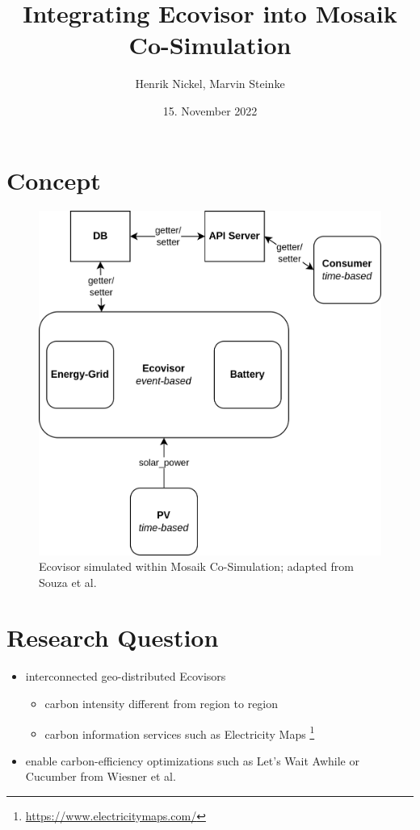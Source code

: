 \documentclass[aspectratio=169]{beamer}
\title[Ecovisor \& Mosaik Co-Simulation]{Integrating Ecovisor into Mosaik Co-Simulation}
\author[Nickel \& Steinke]{Henrik Nickel, Marvin Steinke}
\institute{Technische Universität Berlin}
\date{15. November 2022}
\begin{document}
\frame[plain]{\titlepage}

\section{Concept}
\begin{frame}
    \begin{figure}
    \begin{minipage}{\textwidth}
        \hspace{6.7mm}\includegraphics[width=.65\textwidth]{sketch}
        \caption{Ecovisor simulated within Mosaik Co-Simulation; adapted from
        Souza et al. \cite{souza2022}}
    \end{minipage}
    \end{figure}
\end{frame}

\section{Research Question}
\begin{frame}
    \begin{itemize}
        \item interconnected geo-distributed Ecovisors
            \begin{itemize}
                \item carbon intensity different from region to region
                \item carbon information services such as Electricity Maps
                    \footnote{\url{https://www.electricitymaps.com/}\vspace{1cm}}
            \end{itemize}
    \end{itemize}
    \vspace{3mm}
    \begin{itemize}
        \item[\MVRightarrow] enable carbon-efficiency optimizations such as
            Let's Wait Awhile or Cucumber from Wiesner et al. \cite{wiesner2021,
            wiesner2022}
    \end{itemize}
\end{frame}

\appendix

\begin{frame}[noframenumbering]


\end{frame}
\end{document}
